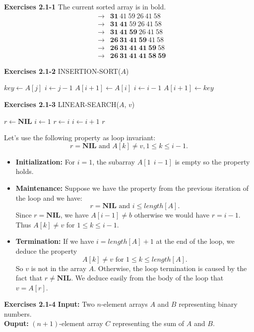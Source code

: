 \documentclass[a4paper,12pt]{article}
\newcommand{\newpar}[1]
{\bigskip \noindent \textbf{Exercises #1} \newline}
\newcommand{\la}{\leftarrow}
\newcommand{\ra}{\rightarrow}
\begin{document}
\newpar{2.1-1} The current sorted array is in bold.
\begin{eqnarray*}
&\ra&\mathbf{31}\ 41\ 59\ 26\ 41\ 58\\&\ra&
\mathbf{31\ 41}\ 59\ 26\ 41\ 58\\&\ra&
\mathbf{31\ 41\ 59}\ 26\ 41\ 58\\&\ra&
\mathbf{26\ 31\ 41\ 59}\ 41\ 58\\&\ra&
\mathbf{26\ 31\ 41\ 41\ 59}\ 58\\&\ra&
\mathbf{26\ 31\ 41\ 41\ 58\ 59}
\end{eqnarray*}

\newpar{2.1-2}
INSERTION-SORT($A$)
\begin{algorithmic}
\FOR{$j \la 2$ to $length[A]$}
	\STATE $key \la A[j]$
	\STATE $i \la j-1$
		\STATE $A[i+1] \la A[i]$
		\STATE $i \la i-1$
	\ENDWHILE
	\STATE $A[i+1] \la key$
\ENDFOR
\end{algorithmic}

\newpar{2.1-3}
LINEAR-SEARCH($A$, $v$)
\begin{algorithmic}
\STATE $r \la \mathbf{NIL}$
\STATE $i \la 1$
		\STATE $r \la i$
	\ENDIF
	\STATE $i \la i+1$
\ENDWHILE
\RETURN $r$
\end{algorithmic}

Let's use the following property as loop invariant:
\[ r = \mathbf{NIL} \mbox{ and } A[k] \not= v, 1\le k \le i-1.\]
\begin{itemize}
\item
\textbf{Initialization: }For $i=1$, the subarray $A[1\ \ i-1]$ is empty
so the property holds.
\item
\textbf{Maintenance: }Suppose we have the property from the previous
iteration of the loop and we have:
\[ r = \mathbf{NIL} \mbox{ and } i \le length[A].\]
Since $r = \mathbf{NIL}$, we have $A[i-1] \not= b$ otherwise we would
have $r = i-1$. Thus $A[k] \not= v$ for $1\le k\le i-1$.
\item
\textbf{Termination: }If we have $i = length[A]+1$ at the end of the
loop, we deduce the property
\[ A[k] \not= v \mbox{ for } 1\le k\le length[A].\]
So $v$ is not in the array $A$.  Otherwise, the loop termination is
caused by the fact that $r \not= \mathbf{NIL}$.  We deduce easily from
the body of the loop that $v = A[r]$.
\end{itemize}

\newpar{2.1-4}
\textbf{Input: } Two $n$-element arrays $A$ and $B$ representing binary
numbers.\\
\textbf{Ouput: } $(n+1)$-element array $C$ representing the sum of $A$
and $B$.
\end{document}
